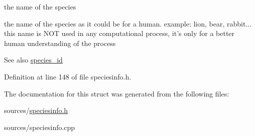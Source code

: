 the name of the species 

the name of the species as it could be for a human. example: lion, bear, rabbit... this name is NOT used in any computational process, it's only for a better human understanding of the process

\begin{DoxySeeAlso}{See also}
\hyperlink{structSpeciesInfo_a528e7f60fc35e38b4f6b12077b0237bc}{species\_\-id} 
\end{DoxySeeAlso}


Definition at line 148 of file speciesinfo.h.



The documentation for this struct was generated from the following files:\begin{DoxyCompactItemize}
\item 
sources/\hyperlink{speciesinfo_8h}{speciesinfo.h}\item 
sources/speciesinfo.cpp\end{DoxyCompactItemize}
